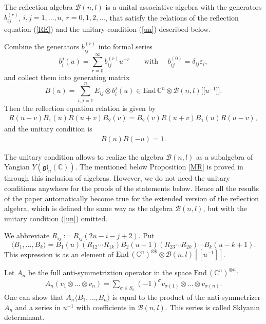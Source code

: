 \documentclass[pdftex]{sigma}
\newcommand{\CC}{\mathbb C}    %
\newcommand{\B}{\mathcal B}
\newcommand{\gl}{\mathfrak {gl}}    %
\begin{document}
 The ref\/lection algebra $\B(n,l)$ is a unital associative algebra with the generators $b_{ij}^{(r)}$, $i,j=1,\dots, n$, $r= 0,1, 2,\dots $, that satisfy the  relations of the ref\/lection equation (\ref{RE}) and the unitary condition (\ref{un}) described below.

Combine the generators $b_{ij}^{(r)}$ into formal series
\[
b_i^{j}(u)=\sum_{r=0}^{\infty}b_{ij}^{(r)}u^{-r}\qquad \text{with }\quad
b^{(0)}_{ij}=\delta_{ij}\varepsilon_{i},
\]
and collect them into generating matrix
\[
B(u)=\sum_{i,j=1}^{n} E_{ij}\otimes b_i^{j}(u)\in \text{End}\, \CC^n\otimes \B(n,l)\big[\big[u^{-1}\big]\big].
\]
Then the ref\/lection equation  relation is given by
\begin{gather}\label{RE}
R(u-v)B_1(u)R(u+v)B_2(v)=B_2(v)R(u+v)B_1(u)R(u-v),
\end{gather}
and the unitary condition  is
\begin{gather}\label{un}
B(u)B(-u)=1.
\end{gather}


\begin{remark}  The unitary condition allows to realize the algebra $\B(n,l)$ as a subalgebra of Yangian  $Y(\gl_n(\CC))$. The mentioned below Proposition \ref{MR} is proved in \cite{MR}  through this inclusion of algebras.
However, we do not need the unitary conditions anywhere for the proofs of the statements below. Hence all the results of the paper automatically become true for the extended version of the ref\/lection algebra, which is def\/ined the same way as the algebra  $\B(n,l)$, but with the unitary condition (\ref{un}) omitted.
\end{remark}

We abbreviate  $R_{ij}:=R_{ij}(2u-i-j+2)$.
Put
\[
\langle B_1,\dots, B_k\rangle =B_1(u)(R_{12}\cdots R_{1k})B_2(u-1) (R_{23}\cdots R_{2k})
\cdots B_ k(u-k+1).
\]
This expression  is as an  element of $\text{End}\, (\CC^n)^{\otimes k }\otimes \B(n,l)[[u^{-1}]]$.

Let $A_n$ be the full  anti-symmetriztion operator in the space $\text{End}\, (\CC^n)^{\otimes n }$:
\begin{gather*}
A_n (v_1\otimes \dots\otimes v_n)=\sum_{\sigma\in S_n} (-1)^{\sigma}
v_{\sigma(1)}\otimes \dots \otimes v_{\sigma(n)}.
\end{gather*}
One can show \cite{MR} that $A_n\langle B_1,\dots, B_n\rangle $ is equal to the product of the anti-symmetrizer $A_n$ and a series in $u^{-1}$   with coef\/f\/icients in $\B(n,l)$. This series is called Sklyanin determinant.
\end{document}
